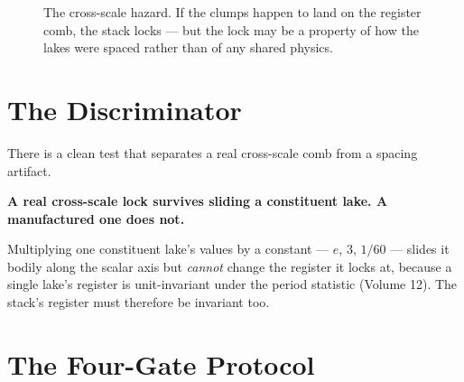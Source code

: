 \documentclass[11pt, letterpaper, openany]{book}
\begin{document}
\begin{figure}[H]
\centering
{}
\caption{The cross-scale hazard. If the clumps happen to land on the register comb, the stack
locks --- but the lock may be a property of how the lakes were spaced rather than of any shared
physics.}
\end{figure}

\section{The Discriminator}

There is a clean test that separates a real cross-scale comb from a spacing artifact.

\begin{signalbox}
\textbf{A real cross-scale lock survives sliding a constituent lake. A manufactured one does not.}

\medskip
\noindent Multiplying one constituent lake's values by a constant --- $e$, $3$, $1/60$
--- slides it bodily along the scalar axis but \emph{cannot} change the register it locks at,
because a single lake's register is unit-invariant under the period statistic (Volume 12). The
stack's register must therefore be invariant too.
\end{signalbox}

\section{The Four-Gate Protocol}
\end{document}
